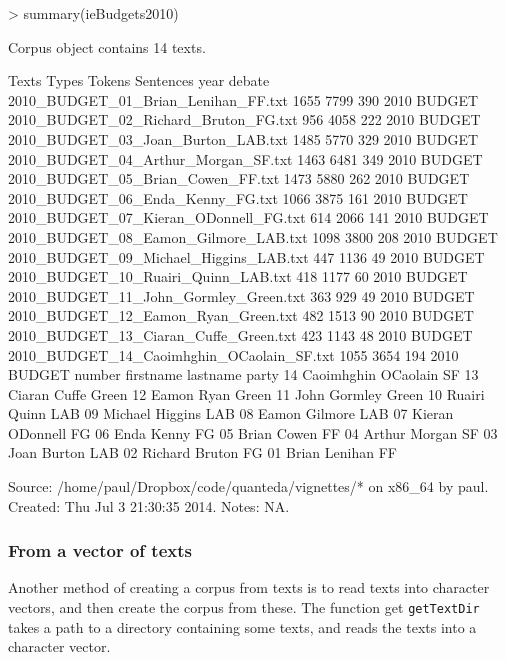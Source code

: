 \documentclass[11pt]{article}
\begin{document}
\begin{Schunk}
\begin{Sinput}
> summary(ieBudgets2010)
\end{Sinput}
\begin{Soutput}
Corpus object contains 14 texts.

                                     Texts Types Tokens Sentences year debate
       2010_BUDGET_01_Brian_Lenihan_FF.txt  1655   7799       390 2010 BUDGET
      2010_BUDGET_02_Richard_Bruton_FG.txt   956   4058       222 2010 BUDGET
        2010_BUDGET_03_Joan_Burton_LAB.txt  1485   5770       329 2010 BUDGET
       2010_BUDGET_04_Arthur_Morgan_SF.txt  1463   6481       349 2010 BUDGET
         2010_BUDGET_05_Brian_Cowen_FF.txt  1473   5880       262 2010 BUDGET
          2010_BUDGET_06_Enda_Kenny_FG.txt  1066   3875       161 2010 BUDGET
     2010_BUDGET_07_Kieran_ODonnell_FG.txt   614   2066       141 2010 BUDGET
      2010_BUDGET_08_Eamon_Gilmore_LAB.txt  1098   3800       208 2010 BUDGET
    2010_BUDGET_09_Michael_Higgins_LAB.txt   447   1136        49 2010 BUDGET
       2010_BUDGET_10_Ruairi_Quinn_LAB.txt   418   1177        60 2010 BUDGET
     2010_BUDGET_11_John_Gormley_Green.txt   363    929        49 2010 BUDGET
       2010_BUDGET_12_Eamon_Ryan_Green.txt   482   1513        90 2010 BUDGET
     2010_BUDGET_13_Ciaran_Cuffe_Green.txt   423   1143        48 2010 BUDGET
 2010_BUDGET_14_Caoimhghin_OCaolain_SF.txt  1055   3654       194 2010 BUDGET
 number  firstname lastname party
     14 Caoimhghin OCaolain    SF
     13     Ciaran    Cuffe Green
     12      Eamon     Ryan Green
     11       John  Gormley Green
     10     Ruairi    Quinn   LAB
     09    Michael  Higgins   LAB
     08      Eamon  Gilmore   LAB
     07     Kieran ODonnell    FG
     06       Enda    Kenny    FG
     05      Brian    Cowen    FF
     04     Arthur   Morgan    SF
     03       Joan   Burton   LAB
     02    Richard   Bruton    FG
     01      Brian  Lenihan    FF

Source:  /home/paul/Dropbox/code/quanteda/vignettes/* on x86_64 by paul.
Created: Thu Jul  3 21:30:35 2014.
Notes:   NA.
\end{Soutput}
\end{Schunk}

\subsubsection{From a vector of texts}

Another method of creating a corpus from texts is to read texts into character vectors, and then create the corpus from these. The function get \texttt{getTextDir} takes a path to a directory containing some texts, and reads the texts into a character vector.
\end{document}
